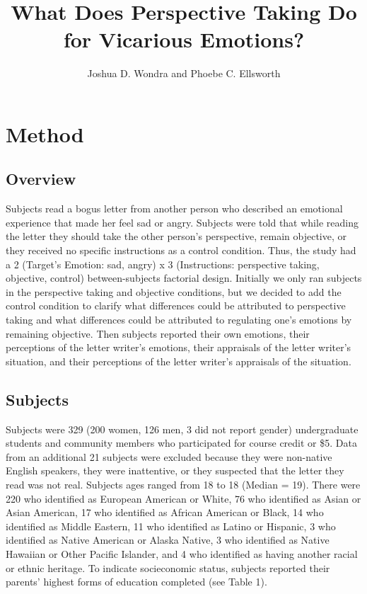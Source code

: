 \documentclass[man,a4paper,noextraspace,apacite]{apa6}
\title{What Does Perspective Taking Do for Vicarious Emotions?}
\author{Joshua D. Wondra and Phoebe C. Ellsworth}
\affiliation{University of Michigan}
\begin{document}
\maketitle

\section{Method}



\subsection{Overview}

    Subjects read a bogus letter from another person who described an emotional experience that made her feel sad or angry. Subjects were told that while reading the letter they should take the other person's perspective, remain objective, or they received no specific instructions as a control condition. Thus, the study had a 2 (Target's Emotion: sad, angry) x 3 (Instructions: perspective taking, objective, control) between-subjects factorial design. Initially we only ran subjects in the perspective taking and objective conditions, but we decided to add the control condition to clarify what differences could be attributed to perspective taking and what differences could be attributed to regulating one's emotions by remaining objective. Then subjects reported their own emotions, their perceptions of the letter writer's emotions, their appraisals of the letter writer's situation, and their perceptions of the letter writer's appraisals of the situation.
    
\subsection{Subjects}

    Subjects were 329 (200 women, 126 men, 3 did not report gender) undergraduate students and community members who participated for course credit or \$5. Data from an additional 21 subjects were excluded because they were non-native English speakers, they were inattentive, or they suspected that the letter they read was not real. Subjects ages ranged from 18 to 18 (Median = 19). There were 220 who identified as European American or White, 76 who identified as Asian or Asian American, 17 who identified as African American or Black, 14 who identified as Middle Eastern, 11 who identified as Latino or Hispanic, 3 who identified as Native American or Alaska Native, 3 who identified as Native Hawaiian or Other Pacific Islander, and 4 who identified as having another racial or ethnic heritage. To indicate socieconomic status, subjects reported their parents' highest forms of education completed (see Table 1).
    
\end{document}
